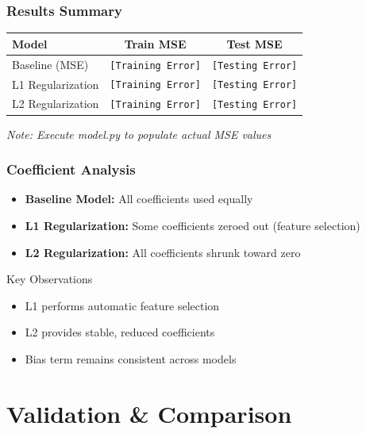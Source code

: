 \documentclass[11pt,aspectratio=169]{beamer}
\begin{document}
\begin{frame}
    \frametitle{Results Summary}
    \begin{table}
        \centering
        \normalsize
        \begin{tabular}{lcc}
            \toprule
            \textbf{Model} & \textbf{Train MSE} & \textbf{Test MSE} \\
            \midrule
            Baseline (MSE) & \texttt{[Training Error]} & \texttt{[Testing Error]} \\
            L1 Regularization & \texttt{[Training Error]} & \texttt{[Testing Error]} \\
            L2 Regularization & \texttt{[Training Error]} & \texttt{[Testing Error]} \\
            \bottomrule
        \end{tabular}
        \vspace{0.5cm}
        \small
        \textit{Note: Execute model.py to populate actual MSE values}
    \end{table}
\end{frame}

\begin{frame}
    \frametitle{Coefficient Analysis}
    \begin{itemize}
        \item \textbf{Baseline Model:} All coefficients used equally
        \item \textbf{L1 Regularization:} Some coefficients zeroed out (feature selection)
        \item \textbf{L2 Regularization:} All coefficients shrunk toward zero
    \end{itemize}
    \vspace{0.5cm}
    \begin{block}{Key Observations}
        \begin{itemize}
            \item L1 performs automatic feature selection
            \item L2 provides stable, reduced coefficients
            \item Bias term remains consistent across models
        \end{itemize}
    \end{block}
\end{frame}

\section{Validation \& Comparison}
\end{document}
